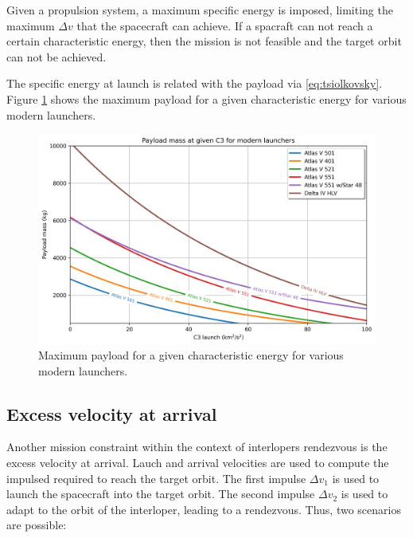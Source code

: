Given a propulsion system, a maximum specific energy is imposed, limiting the
maximum $\Delta v$ that the spacecraft can achieve. If a spacraft can not reach
a certain characteristic energy, then the mission is not feasible and the
target orbit can not be achieved.

The specific energy at launch is related with the payload via
\ref{eq:tsiolkovsky}. Figure \ref{payload_vs_c3} shows the maximum payload for a
given characteristic energy for various modern launchers.

\begin{figure}[H]
  \centering
  \includegraphics[width=\textwidth]{fig/static/payload_vs_c3}
   \caption[Maximum payload for a given characteristic energy for various modern]{Maximum payload for a given characteristic energy for various modern launchers.}
  \label{payload_vs_c3}
\end{figure}

\subsection{Excess velocity at arrival}
\label{sec:excess_velocity}

Another mission constraint within the context of interlopers rendezvous is the
excess velocity at arrival. Lauch and arrival velocities are used to compute the
impulsed required to reach the target orbit. The first impulse $\Delta v_1$ is
used to launch the spacecraft into the target orbit. The second impulse $\Delta
  v_2$ is used to adapt to the orbit of the interloper, leading to a rendezvous.
Thus, two scenarios are possible:

